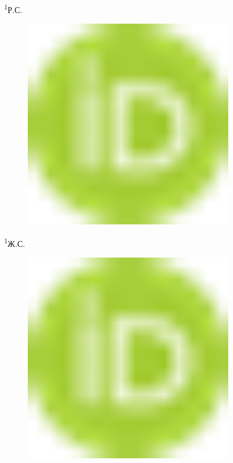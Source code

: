 {\textsuperscript{1}Р.С.
\begin{figure}[H]
	\centering
	\includegraphics[width=0.8\textwidth]{media/ekon2/image1}
	\caption*{}
\end{figure}

\textsuperscript{1}Ж.С.
\begin{figure}[H]
	\centering
	\includegraphics[width=0.8\textwidth]{media/ekon2/image1}
	\caption*{}
\end{figure}


}
